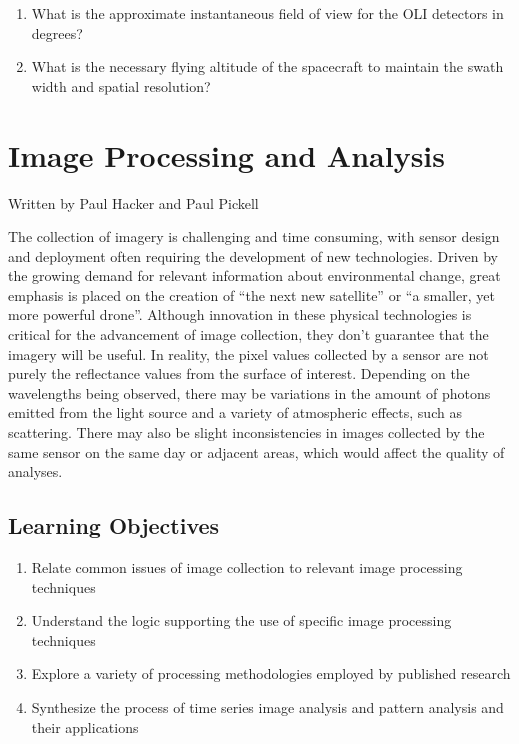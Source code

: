 \documentclass[
]{book}
\providecommand{\tightlist}{%
  \setlength{\itemsep}{0pt}\setlength{\parskip}{0pt}}
\begin{document}
\begin{enumerate}
\def\labelenumi{\arabic{enumi}.}
\setcounter{enumi}{3}
\tightlist
\item
  What is the approximate instantaneous field of view for the OLI detectors in degrees?
\item
  What is the necessary flying altitude of the spacecraft to maintain the swath width and spatial resolution?
\end{enumerate}

\chapter{Image Processing and Analysis}\label{image-processing-and-analysis}

Written by
Paul Hacker and Paul Pickell

The collection of imagery is challenging and time consuming, with sensor design and deployment often requiring the development of new technologies. Driven by the growing demand for relevant information about environmental change, great emphasis is placed on the creation of ``the next new satellite'' or ``a smaller, yet more powerful drone''. Although innovation in these physical technologies is critical for the advancement of image collection, they don't guarantee that the imagery will be useful. In reality, the pixel values collected by a sensor are not purely the reflectance values from the surface of interest. Depending on the wavelengths being observed, there may be variations in the amount of photons emitted from the light source and a variety of atmospheric effects, such as scattering. There may also be slight inconsistencies in images collected by the same sensor on the same day or adjacent areas, which would affect the quality of analyses.

\section*{Learning Objectives}\label{learning-objectives-10}

\begin{enumerate}
\def\labelenumi{\arabic{enumi}.}
\tightlist
\item
  Relate common issues of image collection to relevant image processing techniques
\item
  Understand the logic supporting the use of specific image processing techniques
\item
  Explore a variety of processing methodologies employed by published research
\item
  Synthesize the process of time series image analysis and pattern analysis and their applications
\end{enumerate}
\end{document}
